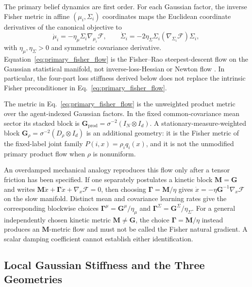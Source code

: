 \documentclass[12pt]{article}
\begin{document}
The primary belief dynamics are first order.  For each Gaussian factor, the inverse Fisher metric in affine $(\mu_i,\Sigma_i)$ coordinates maps the Euclidean coordinate derivatives of the canonical objective to
\begin{equation}
\boxed{
\dot\mu_i=-\eta_\mu\Sigma_i\nabla_{\mu_i}\mathcal F,
\qquad
\dot\Sigma_i=-2\eta_\Sigma\Sigma_i
(\nabla_{\Sigma_i}\mathcal F)\Sigma_i,}
\label{eq:primary_fisher_flow}
\end{equation}
with $\eta_\mu,\eta_\Sigma>0$ and symmetric covariance derivative.  Equation~\eqref{eq:primary_fisher_flow} is the Fisher--Rao steepest-descent flow on the Gaussian statistical manifold, not inverse-loss-Hessian or Newton flow \citep{Amari2016}.  In particular, the four-part loss stiffness derived below does not replace the intrinsic Fisher preconditioner in Eq.~\eqref{eq:primary_fisher_flow}.

The metric in Eq.~\eqref{eq:primary_fisher_flow} is the unweighted product metric over the agent-indexed Gaussian factors.  In the fixed common-covariance mean sector its stacked block is $\mathbf G_{\mathrm{prod}}=\sigma^{-2}(I_N\otimes I_d)$.  A stationary-measure-weighted block $\mathbf G_\rho=\sigma^{-2}(D_\rho\otimes I_d)$ is an additional geometry: it is the Fisher metric of the fixed-label joint family $P(i,x)=\rho_iq_i(x)$, and it is not the unmodified primary product flow when $\rho$ is nonuniform.

An overdamped mechanical analogy reproduces this flow only after a tensor friction has been specified.  If one separately postulates a kinetic block $\mathbf M=\mathbf G$ and writes $\mathbf M\ddot x+\boldsymbol\Gamma\dot x+\nabla_x\mathcal F=0$, then choosing $\boldsymbol\Gamma=\mathbf M/\eta$ gives $\dot x=-\eta\mathbf G^{-1}\nabla_x\mathcal F$ on the slow manifold.  Distinct mean and covariance learning rates give the corresponding blockwise choices $\boldsymbol\Gamma^\mu=\mathbf G^\mu/\eta_\mu$ and $\boldsymbol\Gamma^\Sigma=\mathbf G^\Sigma/\eta_\Sigma$.  For a general independently chosen kinetic metric $\mathbf M\ne\mathbf G$, the choice $\boldsymbol\Gamma=\mathbf M/\eta$ instead produces an $\mathbf M$-metric flow and must not be called the Fisher natural gradient.  A scalar damping coefficient cannot establish either identification.


\subsection{Local Gaussian Stiffness and the Three Geometries}
\end{document}
